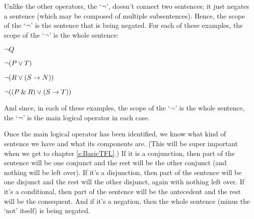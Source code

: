 Unlike the other operators, the `${\neg}$', doesn't connect two sentences; it just negates a sentence (which may be composed of multiple subsentences). Hence, the scope of the `${\neg}$' is the sentence that is being negated. For each of these examples, the scope of the `${\neg}$' is the whole sentence: 

\begin{earg}
\item[\ex{neg1}] ${\neg} Q$
\item[\ex{neg2}] ${\neg}(P \vee T)$
\item[\ex{neg3}] ${\neg}(R \vee (S \rightarrow N))$
\item[\ex{neg4}] ${\neg}((P \mathbin{\&} R) \vee (S \rightarrow T))$
\end{earg}
And since, in each of these examples, the scope of the `${\neg}$' is the whole sentence, the `${\neg}$' is the main logical operator in each case.


Once the main logical operator has been identified, we know what kind of sentence we have and what its components are. (This will be super important when we get to chapter \ref{s:BasicTFL}.)
If it is a conjunction, then part of the sentence will be one conjunct and the rest will be the other conjunct (and nothing will be left over). If it's a disjunction, then part of the sentence will be one disjunct and the rest will the other disjunct, again with nothing left over. If it's a conditional, then part of the sentence will be the antecedent and the rest will be the consequent. And if it's a negation, then the whole sentence (minus the `not' itself) is being negated.




